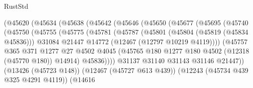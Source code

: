 \begin{lexlean}{RustStd}
\begin{coremodule}
                            (@45620
                              (@45634
                                (@45638
                                  (@45642
                                    (@45646
                                      (@45650
                                        (@45677
                                          (@45695
                                            (@45740
                                              (@45750
                                                (@45755
                                                  (@45775
                                                    (@45781
                                                      (@45787
                                                        (@45801
                                                          (@45804 (@45819 (@45834 @45836)))
                                                          @31084
                                                          @21447
                                                          @14772
                                                          (@12467 (@12797 @10219 @4119))))
                                                      (@45757
                                                        @365
                                                        @371
                                                        @1277
                                                        @27
                                                        @4502
                                                        @4045
                                                        (@45765
                                                          @180
                                                          @1277
                                                          @180
                                                          @4502
                                                          (@12318 (@45770 @180))
                                                          @14914)
                                                        @45836))))
                                                @31137
                                                @31140
                                                @31143
                                                @31146
                                                @21447))
                                            (@13426 (@45723 @148))
                                            (@12467 (@45727 @613 @439))
                                            (@12243 (@45734 @439 @325 @4291 @4119))
                                            (@14616

\end{coremodule}
\end{lexlean}

